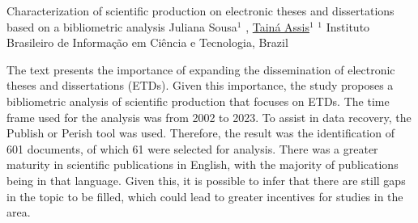 \begin{abstract_online}{Characterization of scientific production on electronic theses and dissertations based on a bibliometric analysis}{%
    Juliana Sousa$^{1}$ , \underline{Tainá Assis}$^{1}$}{%
    }{%
    $^1$ Instituto Brasileiro de Informação em Ciência e Tecnologia, Brazil}


The text presents the importance of expanding the dissemination of electronic theses and dissertations (ETDs). Given this importance, the study proposes a bibliometric analysis of scientific production that focuses on ETDs. The time frame used for the analysis was from 2002 to 2023. To assist in data recovery, the Publish or Perish tool was used. Therefore, the result was the identification of 601 documents, of which 61 were selected for analysis. There was a greater maturity in scientific publications in English, with the majority of publications being in that language. Given this, it is possible to infer that there are still gaps in the topic to be filled, which could lead to greater incentives for studies in the area.

\end{abstract_online}

